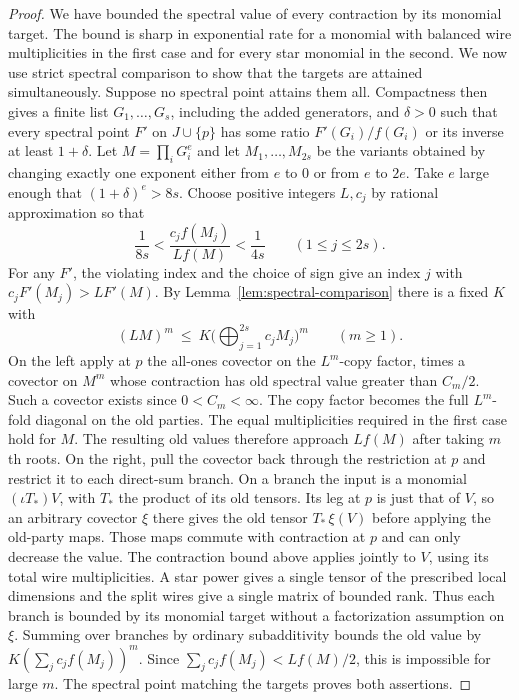 \begin{proof}
We have bounded the spectral value of every contraction by its monomial
target. The bound is sharp in exponential rate for a monomial with balanced
wire multiplicities in the first case and for every star monomial in the
second. We now use strict spectral comparison to show that the targets
are attained simultaneously.
Suppose no spectral point attains them all. Compactness then gives a finite list $G_1,\ldots,G_s$, including
the added generators, and $\delta>0$ such that every spectral point
$F'$ on $J\cup\{p\}$ has some ratio $F'(G_i)/f(G_i)$ or its inverse
at least $1+\delta$. Let $M=\prod_i G_i^e$ and let
$M_1,\ldots,M_{2s}$ be the variants obtained by changing exactly one
exponent either from $e$ to $0$ or from $e$ to $2e$. Take $e$ large
enough that $(1+\delta)^e>8s$. Choose positive integers $L,c_j$ by
rational approximation so that
\[
 \frac1{8s}<\frac{c_j f(M_j)}{L f(M)}<\frac1{4s}
 \qquad(1\le j\le 2s).
\]
For any $F'$, the violating index and the choice of sign give an
index $j$ with $c_jF'(M_j)>L F'(M)$. By
Lemma~\ref{lem:spectral-comparison} there is a fixed $K$ with
\[
 (L M)^m\ \le\ K\biggl(\bigoplus_{j=1}^{2s} c_jM_j\biggr)^m
 \qquad(m\ge1).
\]
On the left apply at $p$ the all-ones covector on the $L^m$-copy
factor, times a covector on $M^m$ whose contraction has old spectral
value greater than $C_m/2$. Such a covector exists since $0<C_m<\infty$. The
copy factor becomes the full $L^m$-fold diagonal on the old parties.
The equal multiplicities required in the first case hold for $M$.
The resulting old values therefore approach $L f(M)$ after taking
$m$th roots. On the right, pull the covector back through the restriction at
$p$ and restrict it to each direct-sum branch. On a branch the input
is a monomial $(\iota T_*)V$, with $T_*$ the product of its old
tensors. Its leg at $p$ is just that of $V$, so an arbitrary covector
$\xi$ there gives the old tensor $T_*\,\xi(V)$ before applying the
old-party maps. Those maps commute with contraction at $p$ and can
only decrease the value. The contraction bound above applies jointly
to $V$, using its total wire multiplicities. A star power gives a
single tensor of the prescribed local dimensions and the split wires
give a single matrix of bounded rank. Thus each branch is bounded by
its monomial target without a factorization assumption on $\xi$.
Summing over branches by ordinary subadditivity bounds the old value by
$K(\sum_j c_j f(M_j))^m$. Since $\sum_j c_j f(M_j)<L f(M)/2$,
this is impossible for large $m$. The spectral point matching the
targets proves both assertions.
\end{proof}

